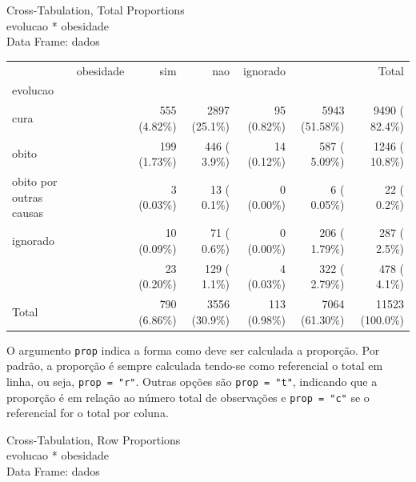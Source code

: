 \documentclass[
  letterpaper,
  DIV=11,
  numbers=noendperiod]{scrreprt}
\newenvironment{Shaded}{\begin{snugshade}}{\end{snugshade}}
\newcommand{\AttributeTok}[1]{\textcolor[rgb]{0.40,0.45,0.13}{#1}}
\newcommand{\FunctionTok}[1]{\textcolor[rgb]{0.28,0.35,0.67}{#1}}
\newcommand{\NormalTok}[1]{\textcolor[rgb]{0.00,0.23,0.31}{#1}}
\newcommand{\SpecialCharTok}[1]{\textcolor[rgb]{0.37,0.37,0.37}{#1}}
\newcommand{\StringTok}[1]{\textcolor[rgb]{0.13,0.47,0.30}{#1}}
\begin{document}
Cross-Tabulation, Total Proportions\\
evolucao * obesidade\\
Data Frame: dados

\begin{longtable}[]{@{}lrrrrrr@{}}
\toprule()
\endhead
& obesidade & sim & nao & ignorado & & Total \\
evolucao & & & & & & \\
cura & & 555 (4.82\%) & 2897 (25.1\%) & 95 (0.82\%) & 5943 (51.58\%) &
9490 ( 82.4\%) \\
obito & & 199 (1.73\%) & 446 ( 3.9\%) & 14 (0.12\%) & 587 ( 5.09\%) &
1246 ( 10.8\%) \\
obito por outras causas & & 3 (0.03\%) & 13 ( 0.1\%) & 0 (0.00\%) & 6 (
0.05\%) & 22 ( 0.2\%) \\
ignorado & & 10 (0.09\%) & 71 ( 0.6\%) & 0 (0.00\%) & 206 ( 1.79\%) &
287 ( 2.5\%) \\
& & 23 (0.20\%) & 129 ( 1.1\%) & 4 (0.03\%) & 322 ( 2.79\%) & 478 (
4.1\%) \\
Total & & 790 (6.86\%) & 3556 (30.9\%) & 113 (0.98\%) & 7064 (61.30\%) &
11523 (100.0\%) \\
\bottomrule()
\end{longtable}

O argumento \texttt{prop} indica a forma como deve ser calculada a
proporção. Por padrão, a proporção é sempre calculada tendo-se como
referencial o total em linha, ou seja, \texttt{prop\ =\ "r"}. Outras
opções são \texttt{prop\ =\ "t"}, indicando que a proporção é em relação
ao número total de observações e \texttt{prop\ =\ "c"} se o referencial
for o total por coluna.

\begin{Shaded}
\end{Shaded}

Cross-Tabulation, Row Proportions\\
evolucao * obesidade\\
Data Frame: dados
\end{document}
